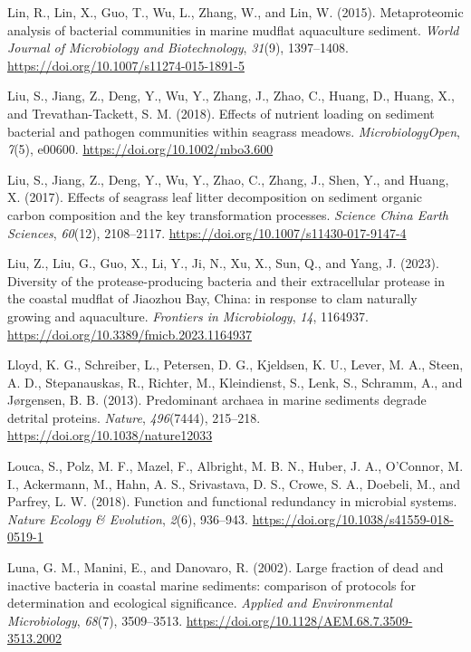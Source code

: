 \documentclass[
  12 pt,
]{book}
\newlength{\cslhangindent}
\newlength{\cslentryspacingunit} %
\newenvironment{CSLReferences}[2] %
 {%
  \setlength{\parindent}{0pt}
  \ifodd #1
  \let\oldpar\par
  \def\par{\hangindent=\cslhangindent\oldpar}
  \fi
  \setlength{\parskip}{#2\cslentryspacingunit}
 }%
 {}
\begin{document}
\begin{CSLReferences}{1}{0}
\leavevmode{}%
Lin, R., Lin, X., Guo, T., Wu, L., Zhang, W., and Lin, W. (2015). Metaproteomic analysis of bacterial communities in marine mudflat aquaculture sediment. \emph{World Journal of Microbiology and Biotechnology}, \emph{31}(9), 1397--1408. \url{https://doi.org/10.1007/s11274-015-1891-5}

\leavevmode{}%
Liu, S., Jiang, Z., Deng, Y., Wu, Y., Zhang, J., Zhao, C., Huang, D., Huang, X., and Trevathan-Tackett, S. M. (2018). Effects of nutrient loading on sediment bacterial and pathogen communities within seagrass meadows. \emph{MicrobiologyOpen}, \emph{7}(5), e00600. \url{https://doi.org/10.1002/mbo3.600}

\leavevmode{}%
Liu, S., Jiang, Z., Deng, Y., Wu, Y., Zhao, C., Zhang, J., Shen, Y., and Huang, X. (2017). Effects of seagrass leaf litter decomposition on sediment organic carbon composition and the key transformation processes. \emph{Science China Earth Sciences}, \emph{60}(12), 2108--2117. \url{https://doi.org/10.1007/s11430-017-9147-4}

\leavevmode{}%
Liu, Z., Liu, G., Guo, X., Li, Y., Ji, N., Xu, X., Sun, Q., and Yang, J. (2023). Diversity of the protease-producing bacteria and their extracellular protease in the coastal mudflat of {Jiaozhou Bay}, {China}: in response to clam naturally growing and aquaculture. \emph{Frontiers in Microbiology}, \emph{14}, 1164937. \url{https://doi.org/10.3389/fmicb.2023.1164937}

\leavevmode{}%
Lloyd, K. G., Schreiber, L., Petersen, D. G., Kjeldsen, K. U., Lever, M. A., Steen, A. D., Stepanauskas, R., Richter, M., Kleindienst, S., Lenk, S., Schramm, A., and Jørgensen, B. B. (2013). Predominant archaea in marine sediments degrade detrital proteins. \emph{Nature}, \emph{496}(7444), 215--218. \url{https://doi.org/10.1038/nature12033}

\leavevmode{}%
Louca, S., Polz, M. F., Mazel, F., Albright, M. B. N., Huber, J. A., O'Connor, M. I., Ackermann, M., Hahn, A. S., Srivastava, D. S., Crowe, S. A., Doebeli, M., and Parfrey, L. W. (2018). Function and functional redundancy in microbial systems. \emph{Nature Ecology \& Evolution}, \emph{2}(6), 936--943. \url{https://doi.org/10.1038/s41559-018-0519-1}

\leavevmode{}%
Luna, G. M., Manini, E., and Danovaro, R. (2002). Large fraction of dead and inactive bacteria in coastal marine sediments: comparison of protocols for determination and ecological significance. \emph{Applied and Environmental Microbiology}, \emph{68}(7), 3509--3513. \url{https://doi.org/10.1128/AEM.68.7.3509-3513.2002}


\end{CSLReferences}
\end{document}
